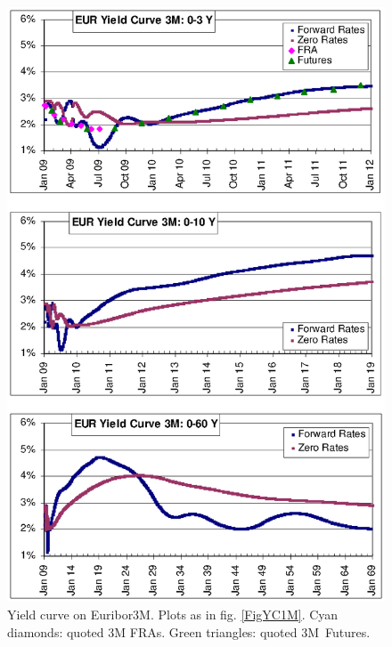 \documentclass[11pt,reqno]{amsart}
\begin{document}
\begin{figure}[tbp]
\centering
\includegraphics[scale=0.9]{./FigYC3M}
\caption{Yield curve on Euribor3M. Plots as in fig. \protect\ref{FigYC1M}. Cyan diamonds: quoted 3M FRAs. Green triangles: quoted 3M\ Futures.}
\label{FigYC3M}
\end{figure}
\end{document}
